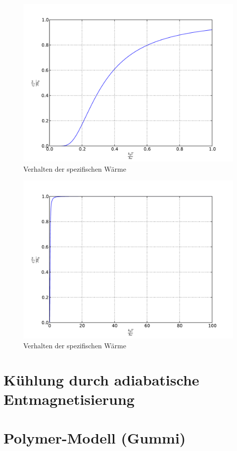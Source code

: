 \begin{figure}
    \centering
    \includegraphics[width=\textwidth]{C_V_Osz_ll.pdf}
    \caption{Verhalten der spezifischen Wärme}
    \label{fig:C_V_Osz_ll}
\end{figure}

\begin{figure}
    \centering
    \includegraphics[width=\textwidth]{C_V_Osz_gg.pdf}
    \caption{Verhalten der spezifischen Wärme}
    \label{fig:C_V_Osz_gg}
\end{figure}

\section{Kühlung durch adiabatische Entmagnetisierung}

\section{Polymer-Modell (Gummi)}



